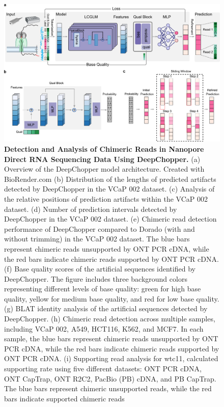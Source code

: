 \documentclass[pdflatex, sn-mathphys-num, lineno]{sn-jnl}%
\theoremstyle{thmstyleone}%
\theoremstyle{thmstyletwo}%
\theoremstyle{thmstylethree}%
\begin{document}
\begin{figure}[!h]
	\includegraphics[height=0.78\columnwidth]{figures/finals/figure1}
    \caption{{\bf  Detection and Analysis of Chimeric Reads in Nanopore Direct RNA Sequencing Data Using DeepChopper.} (a) Overview of the DeepChopper model architecture. Created with BioRender.com (b) Distribution of the lengths of predicted artifacts detected by DeepChopper in the VCaP 002 dataset. (c) Analysis of the relative positions of prediction artifacts within the VCaP 002 dataset.  (d) Number of prediction intervals detected by DeepChopper in the VCaP 002 dataset. (e) Chimeric read detection performance of DeepChopper compared to Dorado (with and without trimming) in the VCaP 002 dataset. The blue bars represent chimeric reads unsupported by ONT PCR cDNA, while the red bars indicate chimeric reads supported by ONT PCR cDNA.  (f) Base quality scores of the artificial sequences identified by DeepChopper. The figure includes three background colors representing different levels of base quality: green for high base quality, yellow for medium base quality, and red for low base quality. (g) BLAT identity analysis of the artificial sequences detected by DeepChopper. (h) Chimeric read detection across multiple samples, including VCaP 002, A549, HCT116, K562, and MCF7. In each sample, the blue bars represent chimeric reads unsupported by ONT PCR cDNA, while the red bars indicate chimeric reads supported by ONT PCR cDNA. (i)  Supporting read analysis for wtc11, calculated supporting rate using five different datasets: ONT PCR cDNA, ONT CapTrap, ONT R2C2, PacBio (PB) cDNA, and PB CapTrap. The blue bars represent chimeric unsupported reads, while the red bars indicate  supported chimeric reads}
	\label{fig:f1}
\end{figure}
\end{document}
